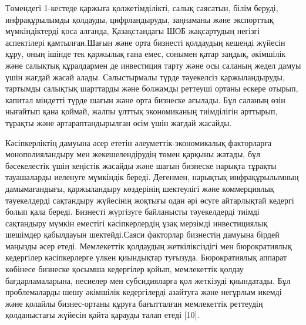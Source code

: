 
Төмендегі 1-кестеде қаржыға қолжетімділікті, салық саясатын, білім
беруді, инфрақұрылымды қолдауды, цифрландыруды, заңнаманы және
экспорттық мүмкіндіктерді қоса алғанда, Қазақстандағы ШОБ жақсартудың
негізгі аспектілері қамтылған.Шағын және орта бизнесті қолдаудың кешенді
жүйесін құру, оның ішінде тек қаржылық ғана емес, сонымен қатар заңдық,
әкімшілік және салықтық құралдармен де инвестиция тарту және осы саланың
жедел дамуы үшін жағдай жасай алады. Салыстырмалы түрде тәуекелсіз
қаржыландыруды, тартымды салықтық шарттарды және болжамды реттеуші
ортаны ескере отырып, капитал міндетті түрде шағын және орта бизнеске
ағылады. Бұл саланың өзін нығайтып қана қоймай, жалпы ұлттық
экономиканың тиімділігін арттырып, тұрақты және әртараптандырылған өсім
үшін жағдай жасайды.

Кәсіпкерліктің дамуына әсер ететін әлеуметтік-экономикалық факторларға
монополияландыру мен жекешелендірудің төмен қарқыны жатады, бұл
бәсекелестік үшін кеңістік жасайды және шағын бизнеске нарықта тұрақты
тауашаларды иеленуге мүмкіндік береді. Дегенмен, нарықтық
инфрақұрылымның дамымағандығы, қаржыландыру көздерінің шектеулігі және
коммерциялық тәуекелдерді сақтандыру жүйесінің жоқтығы одан әрі өсуге
айтарлықтай кедергі болып қала береді. Бизнесті жүргізуге байланысты
тәуекелдерді тиімді сақтандыру мүмкін еместігі кәсіпкерлердің ұзақ
мерзімді инвестициялық шешімдер қабылдауын шектейді.Саяси факторлар
бизнестің дамуына бірдей маңызды әсер етеді. Мемлекеттік қолдаудың
жеткіліксіздігі мен бюрократиялық кедергілер кәсіпкерлерге үлкен
қиындықтар туғызуда. Бюрократиялық аппарат көбінесе бизнеске қосымша
кедергілер қойып, мемлекеттік қолдау бағдарламаларына, несиелер мен
субсидияларға қол жеткізуді қиындатады. Бұл проблемаларды шешу әкімшілік
кедергілерді азайтуға және неғұрлым икемді және қолайлы бизнес-ортаны
құруға бағытталған мемлекеттік реттеудің қолданыстағы жүйесін қайта
қарауды талап етеді {[}10{]}.

